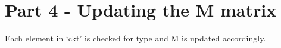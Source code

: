\documentclass[11pt]{article}
\begin{document}
	

	

	
		
    \hypertarget{part-4---updating-the-m-matrix}{%
\section{Part 4 - Updating the M
matrix}\label{part-4---updating-the-m-matrix}}

Each element in `ckt' is checked for type and M is updated accordingly.

	

	
		
	
	
		
			
		
	
		
			
		
	
		
			
		
	
		
			
		
	
		
			
		
	
		
			
		
	
		
			
		
	
		
			
		
	
		
			
		
	
		
			
		
	
		
			
		
	
		
			
		
	
		
			
		
	
		
			
		
	
		
			
		
	
		
			
		
	
		
			
		
	
		
			
		
	
		
			
		
	
		
			
		
	
		
			
		
	
\end{document}

